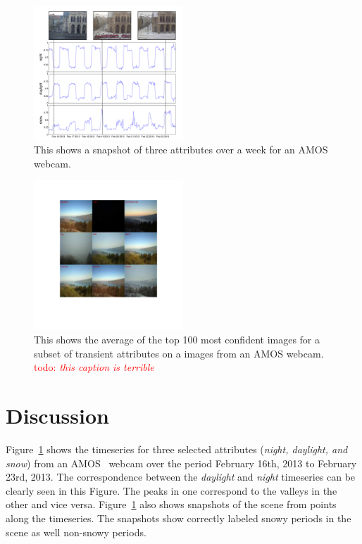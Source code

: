 \documentclass[10pt,twocolumn,letterpaper]{article}
\newcommand{\todo}[1]{\textcolor{red}{todo: {\em #1}}}
\newcommand{\figref}[1]{Figure~\ref{fig:#1}}
\begin{document}
\begin{figure}[t]
	\centering
		\includegraphics[width=0.5\textwidth]{figs/attr_compare.pdf}
		\caption{This shows a snapshot of three attributes over a week for an AMOS
             webcam.}
		\label{fig:attrcmp}
\end{figure}

\begin{figure}[t]
	\centering
		\includegraphics[width=0.5\textwidth, trim= 0 40mm 0 31mm]{figs/montage_pruned_cam_00007371.pdf}
		\caption{This shows the average of the top 100 most confident images for
             a subset of transient attributes on a images from an AMOS webcam.
             \todo{this caption is terrible}} 
		\label{fig:netvis}
\end{figure}

\section{Discussion}
\indent
\figref{attrcmp} shows the timeseries for three selected attributes
(\textit{night, daylight, and snow}) from an AMOS~\cite{jacobs07amos} webcam
over the period February 16th, 2013 to February 23rd, 2013.  The correspondence
between the \textit{daylight} and \textit{night} timeseries can be clearly seen
in this Figure.  The peaks in one correspond to the valleys in the other and
vice versa.  \figref{attrcmp} also shows snapshots of the scene from points
along the timeseries.  The snapshots show correctly labeled snowy periods in
the scene as well non-snowy periods.
\end{document}
